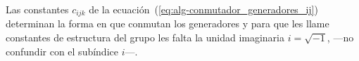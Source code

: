 Las constantes $c_{ijk}$ de la ecuación~(\ref{eq:alg-conmutador_generadores_ij})
determinan la forma en que conmutan los generadores y para que les llame
constantes de estructura del grupo les falta la unidad imaginaria
$i=\sqrt{-1}$, ---no confundir con el subíndice $i$---.
%
%
%
